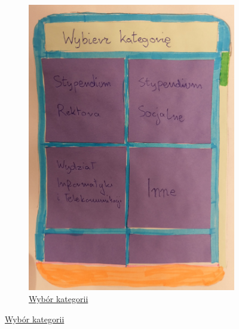 \documentclass[12pt]{article}
\begin{document}
\begin{figure}[h!]
\begin{subfigure}[ba]{1\linewidth}
	\includegraphics[width=\linewidth]{zdj/2.jpg}
	\caption{\underline{Wybór kategorii}}
\end{subfigure}
\end{figure}
\end{document}
